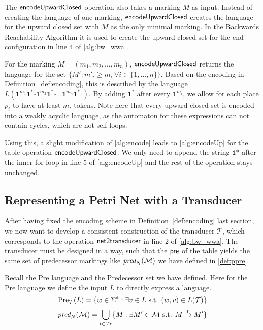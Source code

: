 The $\operatorname{\textsf{encodeUpwardClosed}}$ operation also takes a marking $M$ as input. Instead of creating the language of one marking, $\operatorname{\textsf{encodeUpwardClosed}}$ creates the language for the upward closed set with $M$ as the only minimal marking. In the Backwards Reachability Algorithm it is used to create the upward closed set for the end configuration  in line 4 of \autoref{alg:bw_wwa}.
\par
For the marking $M=(m_{1},m_{2},\dots,m_{n})$, $\operatorname{\textsf{encodeUpwardClosed}}$ returns the language for the set $\{M': m'_{i} \ge m_{i} \ \forall i \in \{1,\dots,n\}\}$. Based on the encoding in Definition~\autoref{def:encoding}, this is described by the language $L(\bm{1}^{m_{1}}\bm{1^{*}} \square \bm{1}^{m_{2}}\bm{1^{*}} \square \ldots \bm{1}^{m_{n}}\bm{1^{*}} \square)$. 
By adding $\bm{1^{*}}$ after every $\bm{1}^{m_{i}}$, we allow for each place $p_{i}$ to have at least $m_{i}$ tokens. Note here that every upward closed set is encoded into a weakly acyclic language, as the automaton for these expressions can not contain cycles, which are not self-loops.
\par
Using this, a slight modification of \autoref{alg:encode} leads to \autoref{alg:encodeUp} for the table operation $\operatorname{\textsf{encodeUpwardClosed}}$. We only need to append the string $\texttt{1*}$ after the inner for loop in line 5 of \autoref{alg:encodeUp} and the rest of the operation stays unchanged. 

\subsection{Representing a Petri Net with a Transducer}
After having fixed the encoding scheme in Definition~\autoref{def:encoding} last section, we now want to develop a consistent construction  of the transducer $\mathcal{T}$, which corresponds to the operation $\operatorname{\textsf{net2transducer}}$ in line 2 of \autoref{alg:bw_wwa}. 
The transducer must be designed in a way, such that the $\operatorname{\textsf{pre}}$ of the table yields the same set of predecessor markings like $\operatorname{\textit{pred}}_{N}(\mathcal{M})$  we have defined in \autoref{def:ppre}.

\par

Recall the Pre language and the Predecessor set we have defined. Here for the Pre language we define the input $L$ to directly express a language.
\begin{equation*}
\operatorname{\text{Pre}}_{\mathcal{T}}(L) = \{ w \in \Sigma^{*}: \exists  v \in L \text{ s.t. } (w,v) \in L(\mathcal{T}) \}
\end{equation*}
\begin{equation*}
\operatorname{\textit{pred}}_{N}(\mathcal{M}) = \bigcup_{t \in \mathit{Tr}} \{M : \exists  M' \in \mathcal{M} \text{ s.t. }  M \xrightarrow{t} M'\}
\end{equation*}

